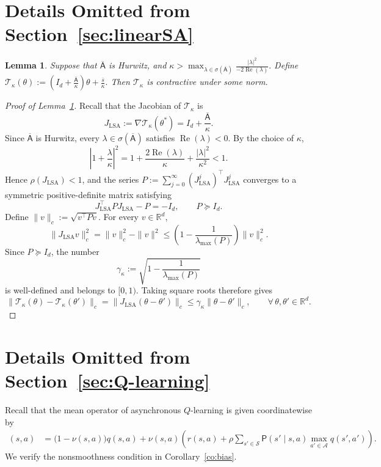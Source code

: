 \documentclass[11pt,letterpaper]{article}
\theoremstyle{plain}
\newtheorem{lemma}{Lemma}
\theoremstyle{definition}
\theoremstyle{remark}
\newcommand{\mS}{\mathcal{S}}
\newcommand{\mA}{\mathcal{A}}
\newcommand{\mT}{\mathcal{T}}
\newcommand{\R}{\mathbb{R}}
\begin{document}
\section{Details Omitted from Section~\ref{sec:linearSA}}
\begin{lemma}
\label{lem:LSA}
Suppose that \(\overline{\mathsf A}\) is Hurwitz, and $\kappa
    >
    \max_{\lambda\in\sigma(\overline{\mathsf A})}
    \frac{|\lambda|^2}{-2\operatorname{Re}(\lambda)}.$ Define $\mT_\kappa(\theta)
    :=
    \left(I_d+\frac{\overline{\mathsf A}}{\kappa}\right)\theta
    +\frac{\overline s}{\kappa}.$ Then \(\mT_\kappa\) is contractive under some norm.
\end{lemma}

\begin{proof}[Proof of Lemma~\ref{lem:LSA}]
Recall that the Jacobian of \(\mT_\kappa\) is
\[
    J_{\mathrm{LSA}}
    :=\nabla\mT_\kappa(\theta^*)
    =I_d+\frac{\overline{\mathsf A}}{\kappa}.
\]
Since $\overline{\mathsf A}$ is Hurwitz,
every $\lambda\in\sigma(\overline{\mathsf A})$ satisfies
$\operatorname{Re}(\lambda)<0$. By the choice of $\kappa$,
\[
    \left|1+\frac{\lambda}{\kappa}\right|^2
    =1+\frac{2\operatorname{Re}(\lambda)}{\kappa}
      +\frac{|\lambda|^2}{\kappa^2}
    <1.
\]
Hence $\rho(J_{\mathrm{LSA}})<1$, and the series $P:=\sum_{j=0}^{\infty}(J_{\mathrm{LSA}}^j)^\top J_{\mathrm{LSA}}^j$ converges to a symmetric positive-definite matrix satisfying
\[
    J_{\mathrm{LSA}}^\top P J_{\mathrm{LSA}}-P=-I_d,
    \qquad P\succeq I_d.
\]
Define $\|v\|_c:=\sqrt{v^\top Pv}$. For every $v\in\R^d$,
\[
    \|J_{\mathrm{LSA}} v\|_c^2
    =\|v\|_c^2-\|v\|^2
    \leq
    \left(1-\frac{1}{\lambda_{\max}(P)}\right)\|v\|_c^2.
\]
Since $P\succeq I_d$, the number
\[
    \gamma_\kappa
    :=\sqrt{1-\frac{1}{\lambda_{\max}(P)}}
\]
is well-defined and belongs to $[0,1)$. Taking square roots therefore
gives
\[
    \|\mT_\kappa(\theta)-\mT_\kappa(\theta')\|_c
    =\|J_{\mathrm{LSA}}(\theta-\theta')\|_c
    \leq\gamma_\kappa\|\theta-\theta'\|_c,
    \qquad \forall\,\theta,\theta'\in\R^d.
\]
\end{proof}

\section{Details Omitted from Section~\ref{sec:Q-learning}}\label{sec:proof-Q-learning}
Recall that the mean operator of asynchronous \(Q\)-learning is given
coordinatewise by
\begin{align}
    [\mT(q)](s,a)
    &=
    \bigl(1-\nu(s,a)\bigr)q(s,a)
    +
    \nu(s,a)
    \left(
        r(s,a)
        +
        \rho
        \sum_{s'\in\mS}
        \mathsf P(s'\mid s,a)
        \max_{a'\in\mA}q(s',a')
    \right).
    \label{eq:q-mean-operator-proof}
\end{align}
We verify the nonsmoothness condition in
Corollary~\ref{co:bias}.
\end{document}
